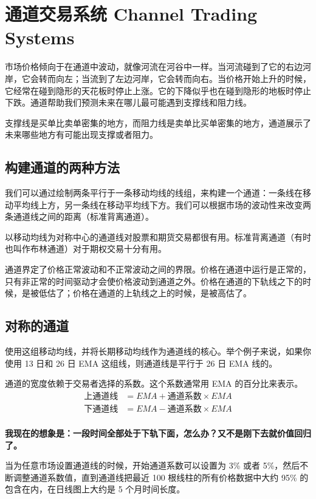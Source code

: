 \section{通道交易系统 Channel Trading Systems}
市场价格倾向于在通道中波动，就像河流在河谷中一样。当河流碰到了它的右边河岸，它会转而向左；当流到了左边河岸，它会转而向右。当价格开始上升的时候，它经常在碰到隐形的天花板时停止上涨。它的下降似乎也在碰到隐形的地板时停止下跌。通道帮助我们预测未来在哪儿最可能遇到支撑线和阻力线。

支撑线是买单比卖单密集的地方，而阻力线是卖单比买单密集的地方，通道展示了未来哪些地方有可能出现支撑或者阻力。
\subsection*{构建通道的两种方法}
我们可以通过绘制两条平行于一条移动均线的线组，来构建一个通道：一条线在移动平均线上方，另一条线在移动平均线下方。我们可以根据市场的波动性来改变两条通道线之间的距离（标准背离通道）。

以移动均线为对称中心的通道线对股票和期货交易都很有用。标准背离通道（有时也叫作布林通道）对于期权交易十分有用。

通道界定了价格正常波动和不正常波动之间的界限。价格在通道中运行是正常的，只有非正常的时间驱动才会使价格波动到通道之外。价格在通道的下轨线之下的时候，是被低估了；价格在通道的上轨线之上的时候，是被高估了。
\subsection*{对称的通道}
使用这组移动均线，并将长期移动均线作为通道线的核心。举个例子来说，如果你使用 13 日和 26 日 EMA 这组线，则通道线是平行于 26 日 EMA 线的。

通道的宽度依赖于交易者选择的系数。这个系数通常用 EMA 的百分比来表示。
\begin{equation}
    \begin{aligned}
        \text{上通道线} & =EMA+\text{通道系数}\times EMA \\
        \text{下通道线} & =EMA-\text{通道系数}\times EMA \\
    \end{aligned}
\end{equation}

\textbf{我现在的想象是：一段时间全部处于下轨下面，怎么办？又不是刚下去就价值回归了。}

当为任意市场设置通道线的时候，开始通道系数可以设置为 3\% 或者 5\%，然后不断调整通道系数值，直到通道线把最近 100 根线柱的所有价格数据中大约 95\% 的包含在内，在日线图上大约是 5 个月时间长度。

